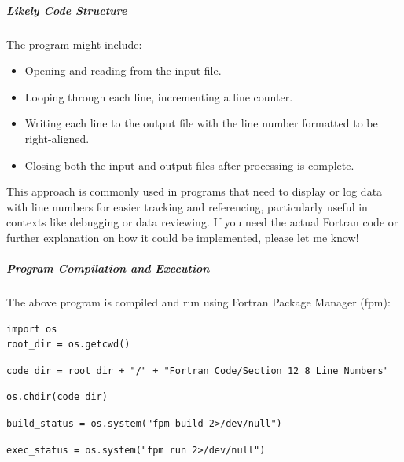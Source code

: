 \subparagraph{Likely Code Structure}

The program might include:

\begin{itemize}
\item Opening and reading from the input file.
\item Looping through each line, incrementing a line counter.
\item Writing each line to the output file with the line number formatted to be right-aligned.
\item Closing both the input and output files after processing is complete.
\end{itemize}

This approach is commonly used in programs that need to display or log data with line numbers for easier tracking and referencing, particularly useful in contexts like debugging or data reviewing. If you need the actual Fortran code or further explanation on how it could be implemented, please let me know!

\subparagraph{Program Compilation and Execution}

The above program is compiled and run using Fortran Package Manager (fpm):

\begin{verbatim}
import os
root_dir = os.getcwd()
\end{verbatim}

\begin{verbatim}
code_dir = root_dir + "/" + "Fortran_Code/Section_12_8_Line_Numbers"
\end{verbatim}

\begin{verbatim}
os.chdir(code_dir)
\end{verbatim}

\begin{verbatim}
build_status = os.system("fpm build 2>/dev/null")
\end{verbatim}

\begin{verbatim}
exec_status = os.system("fpm run 2>/dev/null")
\end{verbatim}

